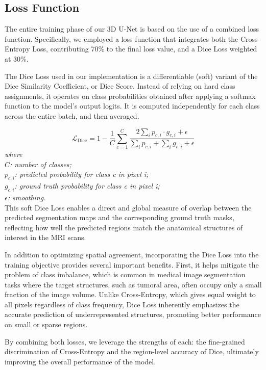 \documentclass[10pt,twocolumn,letterpaper]{article}
\begin{document}
\subsection{Loss Function}
The entire training phase of our 3D U-Net is based on the use of a combined loss function. Specifically, we employed a loss function that integrates both the Cross-Entropy Loss, contributing 70\% to the final loss value, and a Dice Loss weighted at 30\%.

The Dice Loss used in our implementation is a differentiable (soft) variant of the Dice Similarity Coefficient, or Dice Score. Instead of relying on hard class assignments, it operates on class probabilities obtained after applying a softmax function to the model’s output logits. It is computed independently for each class across the entire batch, and then averaged.

\begin{equation}
\mathcal{L}_{\text{Dice}} = 1 - \frac{1}{C} \sum_{c=1}^{C} \frac{2 \sum_i p_{c,i} \cdot g_{c,i} + \epsilon}{\sum_i p_{c,i} + \sum_i g_{c,i} + \epsilon}
\end{equation}
\textit{where}\\
$C$\textit{: number of classes;}\\
$p_{c,i}$\textit{: predicted probability for class c in pixel i;}\\
$g_{c,i}$\textit{: ground truth probability for class c in pixel i;}\\
$\epsilon$\textit{: smoothing.}\\

This soft Dice Loss enables a direct and global measure of overlap between the predicted segmentation maps and the corresponding ground truth masks, reflecting how well the predicted regions match the anatomical structures of interest in the MRI scans.

In addition to optimizing spatial agreement, incorporating the Dice Loss into the training objective provides several important benefits. First, it helps mitigate the problem of class imbalance, which is common in medical image segmentation tasks where the target structures, such as tumoral area, often occupy only a small fraction of the image volume. Unlike Cross-Entropy, which gives equal weight to all pixels regardless of class frequency, Dice Loss inherently emphasizes the accurate prediction of underrepresented structures, promoting better performance on small or sparse regions.

By combining both losses, we leverage the strengths of each: the fine-grained discrimination of Cross-Entropy and the region-level accuracy of Dice, ultimately improving the overall performance of the model.
\end{document}
